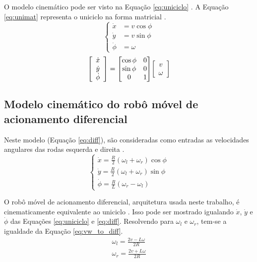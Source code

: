 O modelo cinemático pode ser visto na Equação
\ref{eq:uniciclo} \cite{lavalle2006planning}. A Equação \ref{eq:unimat}
representa o uniciclo na forma matricial \cite{Livro_Siegwart}.
\begin{equation}
	\label{eq:uniciclo}
	\left \{ \begin{matrix} \dot{x} &= v\cos{\phi} \\ \dot{y} &= v\sin{\phi} \\
	\dot{\phi} &= \omega \end{matrix} \right.
\end{equation}
\begin{equation}
	\label{eq:unimat}
	\mleft[ 
	\begin{array}{c c}
	\dot{x} \\ \dot{y} \\ \dot{\phi}
	\end{array}
	\mright] = \mleft[
	\begin{matrix}
		  \cos{\phi} & 0 \\
		  \sin{\phi} & 0 \\
		  0 & 1 \\
	\end{matrix}
	\mright] \mleft[ 
	\begin{array}{c c}
	v \\ \omega
	\end{array}
	\mright]
\end{equation}

	\subsection{Modelo cinemático do robô móvel de acionamento diferencial}	

Neste modelo (Equação \ref{eq:diff}), são consideradas como entradas as
velocidades angulares das rodas esquerda e direita \cite{lavalle2006planning}. 
\begin{equation}
	\label{eq:diff}
	\left \{ \begin{matrix} \dot{x} = \frac{R}{2}(\omega_l +
	\omega_r)\cos{\phi}
	\\
	\dot{y} = \frac{R}{2}(\omega_l +
	\omega_r)\sin{\phi}
	\\
	\dot{\phi} = \frac{R}{L}(\omega_r -
	\omega_l) \end{matrix} \right.
\end{equation}

O robô móvel de acionamento diferencial, arquitetura usada neste trabalho, é
cinematicamente equivalente ao uniciclo \cite{tese:franca}. Isso pode ser
mostrado igualando $\dot{x}$, $\dot{y}$ e $\dot{\phi}$ das Equações
\ref{eq:uniciclo} e \ref{eq:diff}. Resolvendo para $\omega_l$ e $\omega_r$,
tem-se a igualdade da Equação \ref{eq:vw_to_diff}.
\begin{equation}
	\label{eq:vw_to_diff}
	\begin{matrix}
	\omega_l = \frac{2v - L\omega}{2R} 
	\\
	\omega_r = \frac{2v + L\omega}{2R}
	\end{matrix}
\end{equation}

